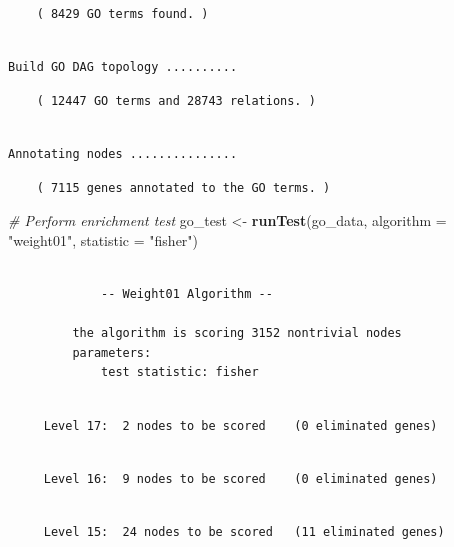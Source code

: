 \documentclass[]{article}
\newenvironment{Shaded}{\begin{snugshade}}{\end{snugshade}}
\newcommand{\KeywordTok}[1]{\textcolor[rgb]{0.13,0.29,0.53}{\textbf{#1}}}
\newcommand{\DataTypeTok}[1]{\textcolor[rgb]{0.13,0.29,0.53}{#1}}
\newcommand{\StringTok}[1]{\textcolor[rgb]{0.31,0.60,0.02}{#1}}
\newcommand{\CommentTok}[1]{\textcolor[rgb]{0.56,0.35,0.01}{\textit{#1}}}
\newcommand{\NormalTok}[1]{#1}
\begin{document}
\begin{verbatim}
    ( 8429 GO terms found. )
\end{verbatim}

\begin{verbatim}

Build GO DAG topology ..........
\end{verbatim}

\begin{verbatim}
    ( 12447 GO terms and 28743 relations. )
\end{verbatim}

\begin{verbatim}

Annotating nodes ...............
\end{verbatim}

\begin{verbatim}
    ( 7115 genes annotated to the GO terms. )
\end{verbatim}

\begin{Shaded}
\begin{Highlighting}[]
\CommentTok{# Perform enrichment test}
\NormalTok{go_test <-}\StringTok{ }\KeywordTok{runTest}\NormalTok{(go_data, }\DataTypeTok{algorithm =} \StringTok{"weight01"}\NormalTok{, }\DataTypeTok{statistic =} \StringTok{"fisher"}\NormalTok{)}
\end{Highlighting}
\end{Shaded}

\begin{verbatim}

             -- Weight01 Algorithm -- 

         the algorithm is scoring 3152 nontrivial nodes
         parameters: 
             test statistic: fisher
\end{verbatim}

\begin{verbatim}

     Level 17:  2 nodes to be scored    (0 eliminated genes)
\end{verbatim}

\begin{verbatim}

     Level 16:  9 nodes to be scored    (0 eliminated genes)
\end{verbatim}

\begin{verbatim}

     Level 15:  24 nodes to be scored   (11 eliminated genes)
\end{verbatim}
\end{document}
